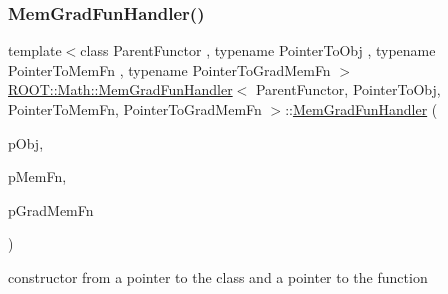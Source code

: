 \subsubsection{\texorpdfstring{MemGradFunHandler()}{MemGradFunHandler()}\hspace{0.1cm}{\footnotesize\ttfamily [5/6]}}
{\footnotesize\ttfamily template$<$class Parent\+Functor , typename Pointer\+To\+Obj , typename Pointer\+To\+Mem\+Fn , typename Pointer\+To\+Grad\+Mem\+Fn $>$ \\
\mbox{\hyperlink{classROOT_1_1Math_1_1MemGradFunHandler}{R\+O\+O\+T\+::\+Math\+::\+Mem\+Grad\+Fun\+Handler}}$<$ Parent\+Functor, Pointer\+To\+Obj, Pointer\+To\+Mem\+Fn, Pointer\+To\+Grad\+Mem\+Fn $>$\+::\mbox{\hyperlink{classROOT_1_1Math_1_1MemGradFunHandler}{Mem\+Grad\+Fun\+Handler}} (\begin{DoxyParamCaption}\item[{const Pointer\+To\+Obj \&}]{p\+Obj,  }\item[{Pointer\+To\+Mem\+Fn}]{p\+Mem\+Fn,  }\item[{Pointer\+To\+Grad\+Mem\+Fn}]{p\+Grad\+Mem\+Fn }\end{DoxyParamCaption})\hspace{0.3cm}{\ttfamily [inline]}}



constructor from a pointer to the class and a pointer to the function 

\mbox{\label{classROOT_1_1Math_1_1MemGradFunHandler_a1e421d0a42589a826fd0b9f7f1a475ec}} 

